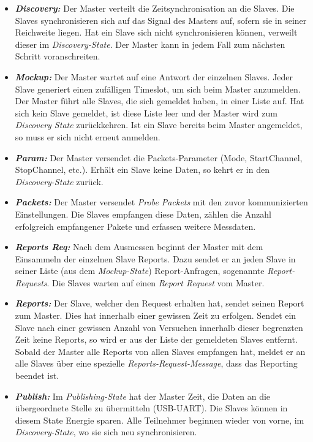 \begin{itemize}
	\item \textbf{\textit{Discovery:}} Der Master verteilt die Zeitsynchronisation an die Slaves. Die Slaves synchronisieren sich auf das Signal des Masters auf, sofern sie in seiner Reichweite liegen. Hat ein Slave sich nicht synchronisieren können, verweilt dieser im \textit{Discovery-State}. Der Master kann in jedem Fall zum nächsten Schritt voranschreiten.
	 
	\item \textbf{\textit{Mockup:}} Der Master wartet auf eine Antwort der einzelnen Slaves. Jeder Slave generiert einen zufälligen Timeslot, um sich beim Master anzumelden. Der Master führt alle Slaves, die sich gemeldet haben, in einer Liste auf. Hat sich kein Slave gemeldet, ist diese Liste leer und der Master wird zum \textit{Discovery State} zurückkehren. Ist ein Slave bereits beim Master angemeldet, so muss er sich nicht erneut anmelden. 
	
	\item \textbf{\textit{Param:}} Der Master versendet die Packets-Parameter (Mode, StartChannel, StopChannel, etc.). Erhält ein Slave keine Daten, so kehrt er in den \textit{Discovery-State} zurück. 
	
	\item \textbf{\textit{Packets:}} Der Master versendet \textit{Probe Packets} mit den zuvor kommunizierten Einstellungen. Die Slaves empfangen diese Daten, zählen die Anzahl erfolgreich empfangener Pakete und erfassen weitere Messdaten. 
	\item  \textbf{\textit{Reports Req:}} Nach dem Ausmessen beginnt der Master mit dem Einsammeln der einzelnen Slave Reports. Dazu sendet er an jeden Slave in seiner Liste (aus dem \textit{Mockup-State}) Report-Anfragen, sogenannte \textit{Report-Requests}. Die Slaves warten auf einen \textit{Report Request} vom Master. 
	
	\item  \textbf{\textit{Reports:}} Der Slave, welcher den Request erhalten hat, sendet seinen Report zum Master. Dies hat innerhalb einer gewissen Zeit zu erfolgen. Sendet ein Slave nach einer gewissen Anzahl von Versuchen innerhalb dieser begrenzten Zeit keine Reports, so wird er aus der Liste der gemeldeten Slaves entfernt. Sobald der Master alle Reports von allen Slaves empfangen hat, meldet er an alle Slaves über eine spezielle \textit{Reports-Request-Message}, dass das Reporting beendet ist.
	
	\item  \textbf{\textit{Publish:}} Im \textit{Publishing-State} hat der Master Zeit, die Daten an die übergeordnete Stelle zu übermitteln (USB-UART). Die Slaves können in diesem State Energie sparen. Alle Teilnehmer beginnen wieder von vorne, im \textit{Discovery-State}, wo sie sich neu synchronisieren. 
\end{itemize}


